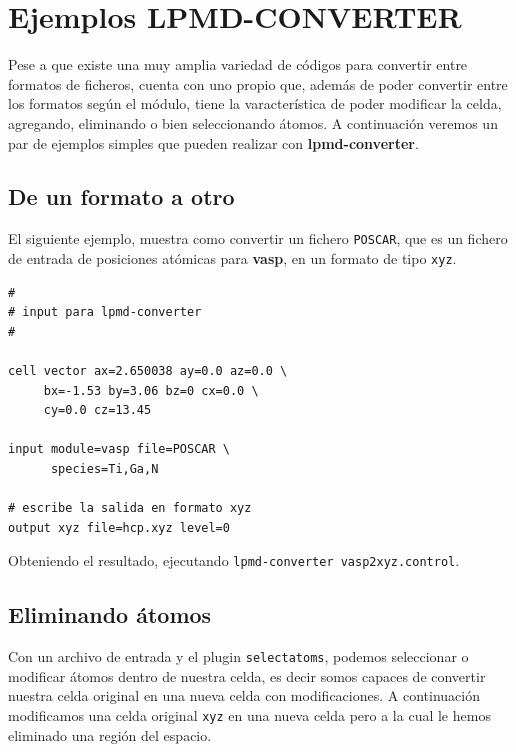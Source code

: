 \section{Ejemplos LPMD-CONVERTER}

Pese a que existe una muy amplia variedad de c\'odigos para convertir entre formatos de ficheros, {\lpmd} cuenta con uno propio que, adem\'as de poder convertir entre los formatos seg\'un el m\'odulo, tiene la varacter\'istica de poder modificar la celda, agregando, eliminando o bien seleccionando \'atomos. A continuaci\'on veremos un par de ejemplos simples que pueden realizar con \textbf{lpmd-converter}.

\subsection{De un formato a otro}

El siguiente ejemplo, muestra como convertir un fichero \verb|POSCAR|, que es un fichero de entrada de posiciones at\'omicas para \textbf{vasp}, en un formato de tipo \verb|xyz|.

\begin{multicols}{2}
\setlength{\columnseprule}{.5pt}
\begin{verbatim}
#
# input para lpmd-converter
#

cell vector ax=2.650038 ay=0.0 az=0.0 \
     bx=-1.53 by=3.06 bz=0 cx=0.0 \
     cy=0.0 cz=13.45

input module=vasp file=POSCAR \
      species=Ti,Ga,N

# escribe la salida en formato xyz
output xyz file=hcp.xyz level=0
\end{verbatim}
\end{multicols}

Obteniendo el resultado, ejecutando \verb|lpmd-converter vasp2xyz.control|.

\subsection{Eliminando \'atomos}

Con un archivo de entrada y el plugin \verb|selectatoms|, podemos seleccionar o modificar \'atomos dentro de nuestra celda, es decir somos capaces de convertir nuestra celda original en una nueva celda con modificaciones. A continuaci\'on modificamos una celda original \verb|xyz| en una nueva celda pero a la cual le hemos eliminado una regi\'on del espacio.

